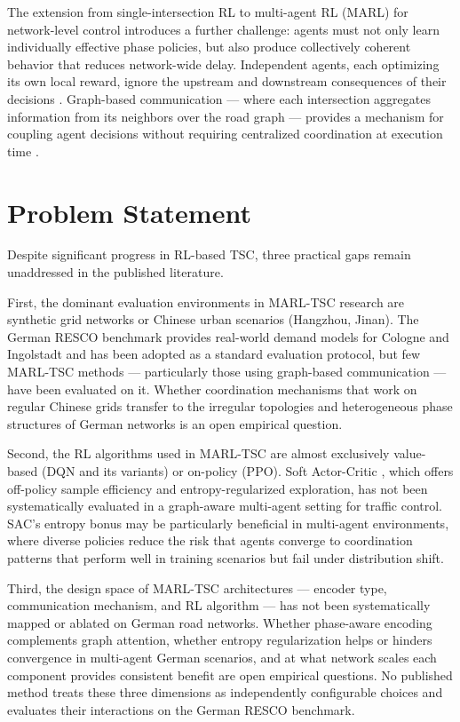The extension from single-intersection RL to multi-agent RL (MARL) for network-level control introduces a further challenge: agents must not only learn individually effective phase policies, but also produce collectively coherent behavior that reduces network-wide delay. Independent agents, each optimizing its own local reward, ignore the upstream and downstream consequences of their decisions \citep{chen2020toward,ault2021reinforcement}. Graph-based communication — where each intersection aggregates information from its neighbors over the road graph — provides a mechanism for coupling agent decisions without requiring centralized coordination at execution time \citep{wei2019colight}.


\section{Problem Statement}
\label{sec:Introduction_ProblemStatement}

Despite significant progress in RL-based TSC, three practical gaps remain unaddressed in the published literature.

First, the dominant evaluation environments in MARL-TSC research are synthetic grid networks or Chinese urban scenarios (Hangzhou, Jinan). The German RESCO benchmark \citep{ault2021reinforcement} provides real-world demand models for Cologne and Ingolstadt and has been adopted as a standard evaluation protocol, but few MARL-TSC methods — particularly those using graph-based communication — have been evaluated on it. Whether coordination mechanisms that work on regular Chinese grids transfer to the irregular topologies and heterogeneous phase structures of German networks is an open empirical question.

Second, the RL algorithms used in MARL-TSC are almost exclusively value-based (DQN and its variants) or on-policy (PPO). Soft Actor-Critic \citep{haarnoja2018soft}, which offers off-policy sample efficiency and entropy-regularized exploration, has not been systematically evaluated in a graph-aware multi-agent setting for traffic control. SAC's entropy bonus may be particularly beneficial in multi-agent environments, where diverse policies reduce the risk that agents converge to coordination patterns that perform well in training scenarios but fail under distribution shift.

Third, the design space of MARL-TSC architectures — encoder type, communication mechanism, and RL algorithm — has not been systematically mapped or ablated on German road networks. Whether phase-aware encoding complements graph attention, whether entropy regularization helps or hinders convergence in multi-agent German scenarios, and at what network scales each component provides consistent benefit are open empirical questions. No published method treats these three dimensions as independently configurable choices and evaluates their interactions on the German RESCO benchmark.


